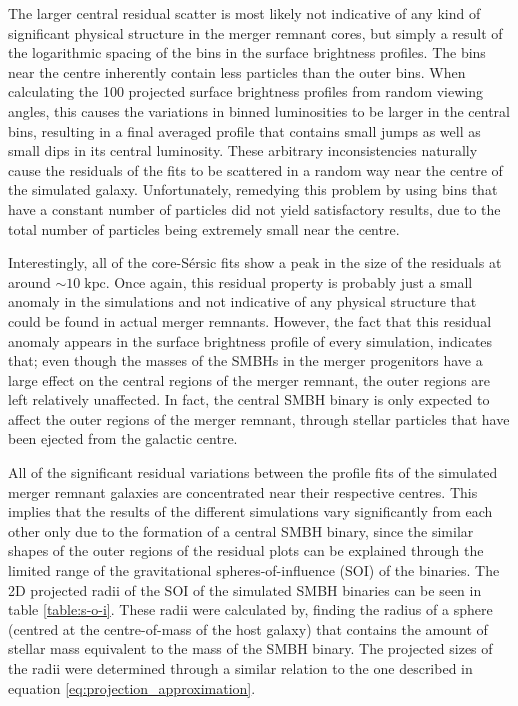 \documentclass[english, twoside]{HYgradu}
\begin{document}
The larger central residual scatter is most likely not indicative of any kind of significant physical structure in the merger remnant cores, but simply a result of the logarithmic spacing of the bins in the surface brightness profiles. The bins near the centre inherently contain less particles than the outer bins. When calculating the 100 projected surface brightness profiles from random viewing angles, this causes the variations in binned luminosities to be larger in the central bins, resulting in a final averaged profile that contains small jumps as well as small dips in its central luminosity. These arbitrary inconsistencies naturally cause the residuals of the fits to be scattered in a random way near the centre of the simulated galaxy. Unfortunately, remedying this problem by using bins that have a constant number of particles did not yield satisfactory results, due to the total number of particles being extremely small near the centre.

Interestingly, all of the core-Sérsic fits show a peak in the size of the residuals at around $\sim 10 \; \mathrm{kpc}$. Once again, this residual property is probably just a small anomaly in the simulations and not indicative of any physical structure that could be found in actual merger remnants. However, the fact that this residual anomaly appears in the surface brightness profile of every simulation, indicates that; even though the masses of the SMBHs in the merger progenitors have a large effect on the central regions of the merger remnant, the outer regions are left relatively unaffected. In fact, the central SMBH binary is only expected to affect the outer regions of the merger remnant, through stellar particles that have been ejected from the galactic centre. 

All of the significant residual variations between the profile fits of the simulated merger remnant galaxies are concentrated near their respective centres. This implies that the results of the different simulations vary significantly from each other only due to the formation of a central SMBH binary, since the similar shapes of the outer regions of the residual plots can be explained through the limited range of the gravitational spheres-of-influence (SOI) of the binaries. The 2D projected radii of the SOI of the simulated SMBH binaries can be seen in table \ref{table:s-o-i}. These radii were calculated by, finding the radius of a sphere (centred at the centre-of-mass of the host galaxy) that contains the amount of stellar mass equivalent to the mass of the SMBH binary. The projected sizes of the radii were determined through a similar relation to the one described in equation \ref{eq:projection_approximation}.
\end{document}
